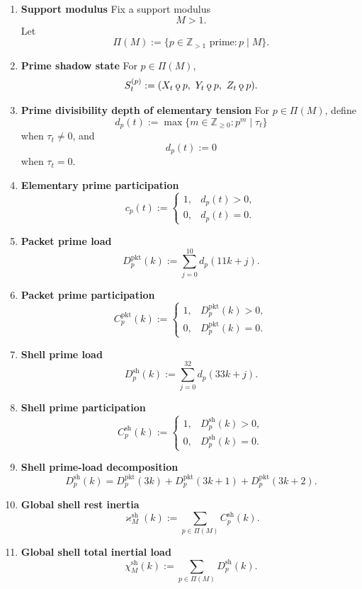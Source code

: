 \documentclass[11pt,letterpaper]{article}
\theoremstyle{plain}
\theoremstyle{definition}
\theoremstyle{remark}
\newcommand{\koppa}{\mathbin{\text{\rm\k{o}}}}
\newcommand{\RestInertia}{\varkappa}
\newcommand{\TotInertia}{\chi}
\begin{document}
\begin{enumerate}[resume]
\item \textbf{Support modulus}
Fix a support modulus
\[
M>1.
\]
Let
\[
\Pi(M):=\{p\in\mathbb Z_{>1}\text{ prime}:p\mid M\}.
\]

\item \textbf{Prime shadow state}
For \(p\in\Pi(M)\),
\[
S_t^{(p)}:=(X_t\koppa p,\ Y_t\koppa p,\ Z_t\koppa p).
\]

\item \textbf{Prime divisibility depth of elementary tension}
For \(p\in\Pi(M)\), define
\[
d_p(t):=
\max\{m\in\mathbb Z_{\ge 0}:p^m\mid \tau_t\}
\]
when \(\tau_t\neq 0\), and
\[
d_p(t):=0
\]
when \(\tau_t=0\).

\item \textbf{Elementary prime participation}
\[
c_p(t):=
\begin{cases}
1,& d_p(t)>0,\\
0,& d_p(t)=0.
\end{cases}
\]

\item \textbf{Packet prime load}
\[
D_p^{\mathrm{pkt}}(k):=\sum_{j=0}^{10}d_p(11k+j).
\]

\item \textbf{Packet prime participation}
\[
C_p^{\mathrm{pkt}}(k):=
\begin{cases}
1,& D_p^{\mathrm{pkt}}(k)>0,\\
0,& D_p^{\mathrm{pkt}}(k)=0.
\end{cases}
\]

\item \textbf{Shell prime load}
\[
D_p^{\mathrm{sh}}(k):=\sum_{j=0}^{32}d_p(33k+j).
\]

\item \textbf{Shell prime participation}
\[
C_p^{\mathrm{sh}}(k):=
\begin{cases}
1,& D_p^{\mathrm{sh}}(k)>0,\\
0,& D_p^{\mathrm{sh}}(k)=0.
\end{cases}
\]

\item \textbf{Shell prime-load decomposition}
\[
D_p^{\mathrm{sh}}(k)
=
D_p^{\mathrm{pkt}}(3k)+D_p^{\mathrm{pkt}}(3k+1)+D_p^{\mathrm{pkt}}(3k+2).
\]

\item \textbf{Global shell rest inertia}
\[
\RestInertia_M^{\mathrm{sh}}(k):=\sum_{p\in\Pi(M)}C_p^{\mathrm{sh}}(k).
\]

\item \textbf{Global shell total inertial load}
\[
\TotInertia_M^{\mathrm{sh}}(k):=\sum_{p\in\Pi(M)}D_p^{\mathrm{sh}}(k).
\]


\end{enumerate}
\end{document}
